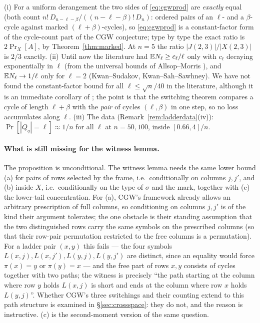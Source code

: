\begin{remark}
(i) For a uniform derangement the two sides of \eqref{eq:cgwprod} are
\emph{exactly} equal (both count $n!\,D_{n-\ell-\beta}/((n-\ell-\beta)!\,D_n)$:
ordered pairs of an $\ell$- and a $\beta$-cycle against marked
$(\ell+\beta)$-cycles), so \eqref{eq:cgwprod} is a constant-factor
form of the cycle-count part of the CGW conjecture; type by type the
exact ratio is $2\Pr_X[A]$, by Theorem~\ref{thm:marked}.  At $n=5$ the
ratio $|J(2,3)|/|X(2,3)|$ is $2/3$ exactly.
(ii) Until now the literature had $\mathbb{E} N_\ell\ge c_\ell/\ell$ only with
$c_\ell$ decaying exponentially in $\ell$ (from the universal bounds of
Allsop--Morris \cite{AM26}), and $\mathbb{E} N_\ell\to1/\ell$ only for $\ell=2$
(Kwan--Sudakov, Kwan--Sah--Sawhney).  We have not found the constant-factor bound for all
$\ell\le\sqrt n/40$ in the literature, although it is an
immediate corollary of \cite{CGW08}; the point is that the switching
theorem compares a cycle of length $\ell+\beta$ with the \emph{pair}
of cycles $(\ell,\beta)$ in one step, so no loss accumulates along
$\ell$.
(iii) The data (Remark~\ref{rem:ladderdata}(iv)): $\Pr[|Q_q|=\ell]\approx1/n$
for all $\ell$ at $n=50,100$, inside $[0.66,4]/n$.
\end{remark}

\paragraph{What is still missing for the witness lemma.}  The
proposition is unconditional.  The witness lemma needs the same lower
bound (a) for pairs of rows selected by the frame, i.e.\ conditionally
on columns $j,j'$, and (b) inside $X$, i.e.\ conditionally on the type
of $\sigma$ and the mark, together with (c) the lower-tail
concentration.  For (a), CGW's framework already allows an arbitrary
prescription of full columns, so conditioning on columns $j,j'$ is of
the kind their argument tolerates; the one obstacle is their standing
assumption that the two distinguished rows carry the same symbols on
the prescribed columns (so that their row-pair permutation restricted
to the free columns is a permutation).  For a ladder pair $(x,y)$ this
fails --- the four symbols $L(x,j),L(x,j'),L(y,j),L(y,j')$ are distinct,
since an equality would force $\pi(x)=y$ or $\pi(y)=x$ --- and the free
part of rows $x,y$ consists of cycles together with two paths; the
witness is precisely ``the path starting at the column where row $y$
holds $L(x,j)$ is short and ends at the column where row $x$ holds
$L(y,j)$''.  Whether CGW's three switchings and their counting extend
to this path structure is examined in \S\ref{sec:crossspace}: they do
not, and the reason is instructive.  (c) is the second-moment version
of the same question.

